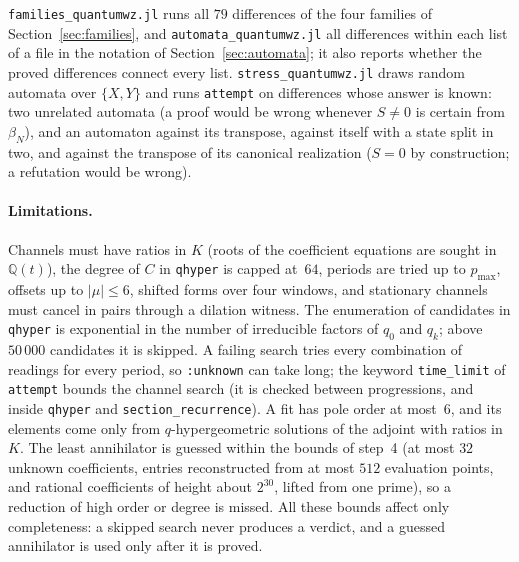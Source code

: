 \documentclass[11pt,a4paper]{article}
\newcommand{\Q}{\mathbb Q}
\theoremstyle{plain}
\theoremstyle{definition}
\theoremstyle{remark}
\begin{document}
\texttt{families\_quantumwz.jl} runs all $79$ differences of the four families of
Section~\ref{sec:families}, and \texttt{automata\_quantumwz.jl} all differences
within each list of a file in the notation of Section~\ref{sec:automata}; it
also reports whether the proved differences connect every list. \texttt{stress\_quantumwz.jl} draws random automata over
$\{X,Y\}$ and runs \texttt{attempt} on differences whose answer is known: two
unrelated automata (a proof would be wrong whenever $S\ne0$ is certain from
$\beta_N$), and an automaton against its transpose, against itself with a state
split in two, and against the transpose of its canonical realization ($S=0$ by
construction; a refutation would be wrong).

\paragraph{Limitations.} Channels must have ratios in $K$ (roots of the
coefficient equations are sought in $\Q(t)$), the degree of $C$ in
\texttt{qhyper} is capped at~$64$, periods are tried up to $p_{\max}$, offsets
up to $|\mu|\le6$, shifted forms over four windows, and stationary channels
must cancel in pairs through a dilation witness. The enumeration of candidates
in \texttt{qhyper} is
exponential in the number of irreducible factors of $q_0$ and $q_k$; above
$50\,000$ candidates it is skipped. A failing search tries every combination of
readings for every period, so \texttt{:unknown} can take long; the keyword
\texttt{time\_limit} of \texttt{attempt} bounds the channel search (it is
checked between progressions, and inside \texttt{qhyper} and
\texttt{section\_recurrence}). A fit has pole order at most~$6$, and its
elements come only from $q$-hypergeometric solutions of the adjoint with ratios
in $K$. The least
annihilator is guessed within the bounds of step~4 (at most $32$ unknown
coefficients, entries reconstructed from at most $512$ evaluation points, and
rational coefficients of height about $2^{30}$, lifted from one prime), so a
reduction of high order or degree is missed. All these bounds affect only
completeness: a skipped search never produces a verdict, and a guessed
annihilator is used only after it is proved.
\end{document}
